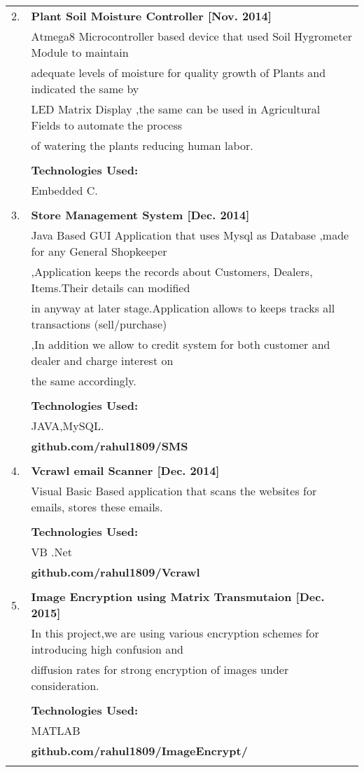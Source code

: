 \documentclass[a4paper,10pt]{article}
\begin{document}
\begin{tabular}{rl}
 \textsc{2.} & {\large\textbf{Plant Soil Moisture Controller [Nov. 2014]}}\\ & \textsc Atmega8 Microcontroller based device that used Soil Hygrometer Module to maintain \\ & adequate levels of moisture for quality growth of Plants and indicated the same by \\ & LED Matrix Display ,the same can be used in Agricultural Fields to automate the process \\ & of watering the plants reducing human labor.
 \\ & \\ &
 \normalsize\textbf{Technologies Used:}\\ & Embedded C.\\ & \\ 
 \textsc{3.} & {\large\textbf{ Store Management System [Dec. 2014]}}\\ & \textsc Java Based GUI Application that uses Mysql as Database ,made for any General Shopkeeper\\ & ,Application keeps the records about Customers, Dealers, Items.Their details can modified \\ & in anyway at later stage.Application allows to keeps tracks all transactions (sell/purchase)\\ & ,In addition we allow to credit system for both customer and dealer and charge interest on \\ & the same accordingly.\\ & \\ &
 \normalsize\textbf{Technologies Used:}\\ & JAVA,MySQL.\\ &
 \normalsize\textbf{github.com/rahul1809/SMS}\\ & \\ 
 \textsc{4.} & {\large\textbf{Vcrawl email Scanner [Dec. 2014]}}\\ & \textsc Visual Basic Based application that scans the websites for emails, stores these emails. \\ & \\ & 
 \normalsize\textbf{Technologies Used:}\\ & VB .Net\\ &
 \normalsize\textbf{github.com/rahul1809/Vcrawl}\\ & \\

\textsc{5.} & {\large\textbf{Image Encryption using Matrix Transmutaion [Dec. 2015]}}\\ & \textsc In this project,we are using various encryption schemes  for introducing high confusion and \\ & diffusion rates for strong encryption of images under consideration. \\ & \\ &
 \normalsize\textbf{Technologies Used:}\\ & MATLAB\\ &
 \normalsize\textbf{github.com/rahul1809/ImageEncrypt/}\\ & \\


\end{tabular}
\end{document}
